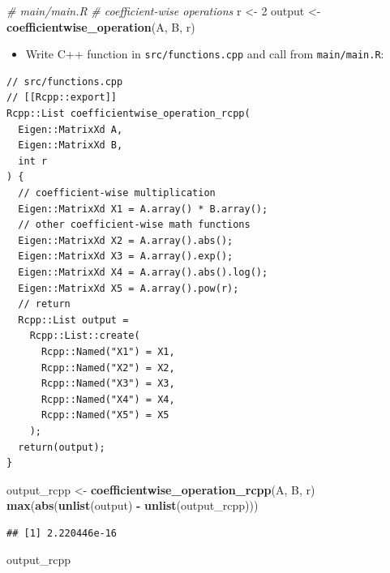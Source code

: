 \documentclass[]{book}
\newenvironment{Shaded}{\begin{snugshade}}{\end{snugshade}}
\newcommand{\KeywordTok}[1]{\textcolor[rgb]{0.13,0.29,0.53}{\textbf{#1}}}
\newcommand{\DecValTok}[1]{\textcolor[rgb]{0.00,0.00,0.81}{#1}}
\newcommand{\StringTok}[1]{\textcolor[rgb]{0.31,0.60,0.02}{#1}}
\newcommand{\CommentTok}[1]{\textcolor[rgb]{0.56,0.35,0.01}{\textit{#1}}}
\newcommand{\OperatorTok}[1]{\textcolor[rgb]{0.81,0.36,0.00}{\textbf{#1}}}
\newcommand{\NormalTok}[1]{#1}
\providecommand{\tightlist}{%
  \setlength{\itemsep}{0pt}\setlength{\parskip}{0pt}}
\begin{document}
\begin{Shaded}
\begin{Highlighting}[]
\CommentTok{# main/main.R}
\CommentTok{# coefficient-wise operations}
\NormalTok{r <-}\StringTok{ }\DecValTok{2}
\NormalTok{output <-}\StringTok{ }\KeywordTok{coefficientwise_operation}\NormalTok{(A, B, r)}
\end{Highlighting}
\end{Shaded}

\begin{itemize}
\tightlist
\item
  Write C++ function in \texttt{src/functions.cpp} and call from
  \texttt{main/main.R}:
\end{itemize}

\begin{verbatim}
// src/functions.cpp
// [[Rcpp::export]]
Rcpp::List coefficientwise_operation_rcpp(
  Eigen::MatrixXd A,
  Eigen::MatrixXd B,
  int r
) {
  // coefficient-wise multiplication
  Eigen::MatrixXd X1 = A.array() * B.array();
  // other coefficient-wise math functions
  Eigen::MatrixXd X2 = A.array().abs();
  Eigen::MatrixXd X3 = A.array().exp();
  Eigen::MatrixXd X4 = A.array().abs().log();
  Eigen::MatrixXd X5 = A.array().pow(r);
  // return
  Rcpp::List output =
    Rcpp::List::create(
      Rcpp::Named("X1") = X1,
      Rcpp::Named("X2") = X2,
      Rcpp::Named("X3") = X3,
      Rcpp::Named("X4") = X4,
      Rcpp::Named("X5") = X5
    );
  return(output);
}
\end{verbatim}

\begin{Shaded}
\begin{Highlighting}[]
\NormalTok{output_rcpp <-}\StringTok{ }\KeywordTok{coefficientwise_operation_rcpp}\NormalTok{(A, B, r)}
\KeywordTok{max}\NormalTok{(}\KeywordTok{abs}\NormalTok{(}\KeywordTok{unlist}\NormalTok{(output) }\OperatorTok{-}\StringTok{ }\KeywordTok{unlist}\NormalTok{(output_rcpp)))}
\end{Highlighting}
\end{Shaded}

\begin{verbatim}
## [1] 2.220446e-16
\end{verbatim}

\begin{Shaded}
\begin{Highlighting}[]
\NormalTok{output_rcpp}
\end{Highlighting}
\end{Shaded}
\end{document}
